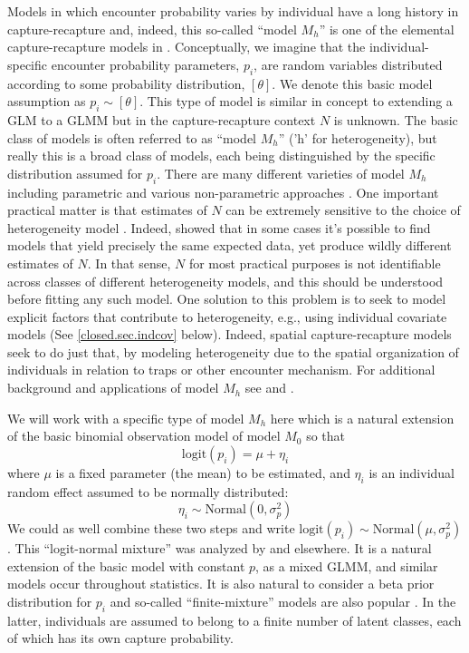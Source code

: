 Models in which encounter probability varies by individual
have a long history in capture-recapture and, indeed, this
so-called ``model $M_h$'' is one of the elemental capture-recapture
models in \citep{otis_etal:1978}. Conceptually, we imagine that
the individual-specific encounter probability
parameters, $p_{i}$, are random variables distributed according to
some probability
distribution, $[\theta]$. We denote this basic model assumption as
$p_{i} \sim [\theta]$. This type of model is similar in concept to
extending a GLM to a GLMM but in the capture-recapture context $N$ is
unknown.  The basic class of models is often referred to as ``model
$M_h$'' ('h' for heterogeneity), but really this is a broad class of models, each being
distinguished by the specific distribution assumed for $p_{i}$.  There
are many different varieties of model $M_{h}$ including parametric and
various
non-parametric approaches
\citep{burnham_overton:1978, norris_pollock:1996, pledger:2000}. One
important practical matter is that estimates of $N$ can be extremely
sensitive to the choice of heterogeneity model
\citep{fienberg_etal:1999, dorazio_royle:2003, link:2003}. Indeed,
\citet{link:2003} showed that in some cases it's possible to find
models that yield precisely the same expected data, yet produce wildly
different estimates of $N$. In that sense, $N$ for most practical
purposes is not identifiable across classes of different heterogeneity
models, and
this should be understood before fitting any such model. One solution
to this problem is to seek to model explicit factors that contribute
to heterogeneity, e.g., using individual covariate models (See
\ref{closed.sec.indcov} below). Indeed, spatial capture-recapture
models seek to do just that, by modeling heterogeneity due to the
spatial organization of individuals in relation to traps or other
encounter mechanism.  For additional background and applications of
model $M_{h}$ see \citet[][Chapt. 6]{royle_dorazio:2008} and
\citet[][Chapt. 6]{kery_schaub:2011}.

We will work with a specific type of model $M_{h}$ here which is a
natural extension of
the basic binomial observation model of model $M_{0}$ so
that
\[
\mbox{logit}(p_{i}) = \mu + \eta_{i}
\]
where $\mu$ is a fixed parameter (the mean) to be estimated, and
$\eta_{i}$ is an individual random effect assumed to be normally distributed:
\[
\eta_{i} \sim \mbox{Normal}(0, \sigma_{p}^2)
\]
We could as well combine these two steps and write $\mbox{logit}(p_{i}) \sim \mbox{Normal}(\mu,\sigma_{p}^2)$.
This ``logit-normal mixture'' was analyzed by
\citet{coull_agresti:1999} and elsewhere. It is a natural extension of
the basic model with constant $p$, as a mixed GLMM, and similar models
occur throughout statistics. It is also natural to consider a beta
prior distribution for $p_{i}$ \citep{dorazio_royle:2003} and
so-called ``finite-mixture'' models are also popular
\citep{norris_pollock:1996, pledger:2000}. In the latter, individuals
are assumed to belong to a finite number of latent classes, each of
which has its own capture probability.




